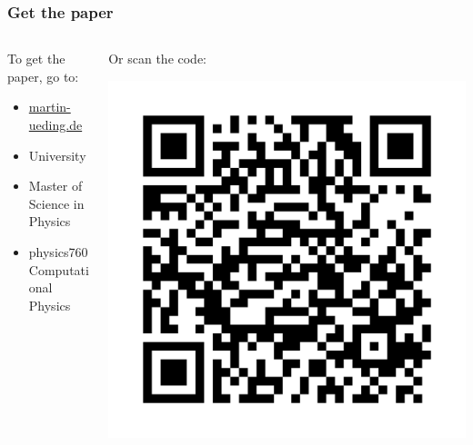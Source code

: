 \documentclass[english, fleqn]{beamer}
\begin{document}
\begin{frame}
    \frametitle{Get the paper}

    \begin{columns}[t]
        \begin{column}{0.5\linewidth}
            To get the paper, go to:
            \begin{itemize}
                \item \href{http://martin-ueding.de/en/university/msc_physics/physics760/index.html}{martin-ueding.de}
                \item University
                \item Master of Science in Physics
                \item physics760 Computational Physics
            \end{itemize}
        \end{column}
        \begin{column}{0.5\linewidth}
            Or scan the code:
            \begin{centering}
                \includegraphics[width=\linewidth]{physics760.png}
            \end{centering}
        \end{column}
    \end{columns}

\end{frame}
\end{document}
